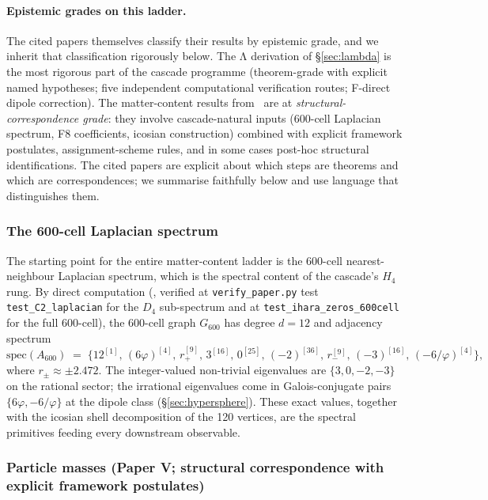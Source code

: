 \documentclass[11pt]{article}
\theoremstyle{plain}
\theoremstyle{definition}
\theoremstyle{remark}
\begin{document}
\paragraph{Epistemic grades on this ladder.} The cited papers themselves classify their results by epistemic grade, and we inherit that classification rigorously below. The Λ derivation of \S\ref{sec:lambda} is the most rigorous part of the cascade programme (theorem-grade with explicit named hypotheses; five independent computational verification routes; F-direct dipole correction). The matter-content results from~\citet{SmartV, SmartXXII, SmartXXXII} are at \emph{structural-correspondence grade}: they involve cascade-natural inputs (600-cell Laplacian spectrum, F8 coefficients, icosian construction) combined with explicit framework postulates, assignment-scheme rules, and in some cases post-hoc structural identifications. The cited papers are explicit about which steps are theorems and which are correspondences; we summarise faithfully below and use language that distinguishes them.

\subsubsection{The 600-cell Laplacian spectrum}

The starting point for the entire matter-content ladder is the 600-cell nearest-neighbour Laplacian spectrum, which is the spectral content of the cascade's $H_4$ rung. By direct computation (\citealp{SmartXXII}, verified at \texttt{verify\_paper.py} test \texttt{test\_C2\_laplacian} for the $D_4$ sub-spectrum and at \texttt{test\_ihara\_zeros\_600cell} for the full 600-cell), the 600-cell graph $G_{600}$ has degree $d = 12$ and adjacency spectrum
\[
  \mathrm{spec}(A_{600}) \;=\; \{12^{[1]}, \, (6\varphi)^{[4]}, \, r_+^{[9]}, \, 3^{[16]}, \, 0^{[25]}, \, (-2)^{[36]}, \, r_-^{[9]}, \, (-3)^{[16]}, \, (-6/\varphi)^{[4]}\},
\]
where $r_\pm \approx \pm 2.472$. The integer-valued non-trivial eigenvalues are $\{3, 0, -2, -3\}$ on the rational sector; the irrational eigenvalues come in Galois-conjugate pairs $\{6\varphi, -6/\varphi\}$ at the dipole class (\S\ref{sec:hypersphere}). These exact values, together with the icosian shell decomposition of the 120 vertices, are the spectral primitives feeding every downstream observable.

\subsubsection{Particle masses (Paper V; structural correspondence with explicit framework postulates)}
\end{document}
